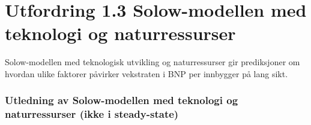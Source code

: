 \documentclass[
  12pt,
  a4paper,
  DIV=11,
  numbers=noendperiod]{scrartcl}
\begin{document}
\clearpage

\section{Utfordring 1.3 Solow-modellen med teknologi og
naturressurser}\label{utfordring-1.3-solow-modellen-med-teknologi-og-naturressurser}

Solow-modellen med teknologisk utvikling og naturressurser gir
prediksjoner om hvordan ulike faktorer påvirker vekstraten i BNP per
innbygger på lang sikt.

\subsubsection{Utledning av Solow-modellen med teknologi og
naturressurser (ikke i
steady-state)}\label{utledning-av-solow-modellen-med-teknologi-og-naturressurser-ikke-i-steady-state}
\end{document}
